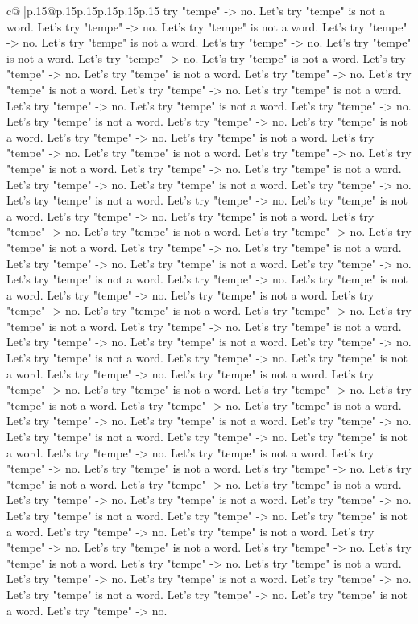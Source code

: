 \documentclass{article}
\begin{document}
{\begin{supertabular}{c@{$\;$}|p{.15\linewidth}@{}p{.15\linewidth}p{.15\linewidth}p{.15\linewidth}p{.15\linewidth}p{.15\linewidth}}
{{{try "tempe" {-}> no. Let's try "tempe" is not a word. Let's try "tempe" {-}> no. Let's try "tempe" is not a word. Let's try "tempe" {-}> no. Let's try "tempe" is not a word. Let's try "tempe" {-}> no. Let's try "tempe" is not a word. Let's try "tempe" {-}> no. Let's try "tempe" is not a word. Let's try "tempe" {-}> no. Let's try "tempe" is not a word. Let's try "tempe" {-}> no. Let's try "tempe" is not a word. Let's try "tempe" {-}> no. Let's try "tempe" is not a word. Let's try "tempe" {-}> no. Let's try "tempe" is not a word. Let's try "tempe" {-}> no. Let's try "tempe" is not a word. Let's try "tempe" {-}> no. Let's try "tempe" is not a word. Let's try "tempe" {-}> no. Let's try "tempe" is not a word. Let's try "tempe" {-}> no. Let's try "tempe" is not a word. Let's try "tempe" {-}> no. Let's try "tempe" is not a word. Let's try "tempe" {-}> no. Let's try "tempe" is not a word. Let's try "tempe" {-}> no. Let's try "tempe" is not a word. Let's try "tempe" {-}> no. Let's try "tempe" is not a word. Let's try "tempe" {-}> no. Let's try "tempe" is not a word. Let's try "tempe" {-}> no. Let's try "tempe" is not a word. Let's try "tempe" {-}> no. Let's try "tempe" is not a word. Let's try "tempe" {-}> no. Let's try "tempe" is not a word. Let's try "tempe" {-}> no. Let's try "tempe" is not a word. Let's try "tempe" {-}> no. Let's try "tempe" is not a word. Let's try "tempe" {-}> no. Let's try "tempe" is not a word. Let's try "tempe" {-}> no. Let's try "tempe" is not a word. Let's try "tempe" {-}> no. Let's try "tempe" is not a word. Let's try "tempe" {-}> no. Let's try "tempe" is not a word. Let's try "tempe" {-}> no. Let's try "tempe" is not a word. Let's try "tempe" {-}> no. Let's try "tempe" is not a word. Let's try "tempe" {-}> no. Let's try "tempe" is not a word. Let's try "tempe" {-}> no. Let's try "tempe" is not a word. Let's try "tempe" {-}> no. Let's try "tempe" is not a word. Let's try "tempe" {-}> no. Let's try "tempe" is not a word. Let's try "tempe" {-}> no. Let's try "tempe" is not a word. Let's try "tempe" {-}> no. Let's try "tempe" is not a word. Let's try "tempe" {-}> no. Let's try "tempe" is not a word. Let's try "tempe" {-}> no. Let's try "tempe" is not a word. Let's try "tempe" {-}> no. Let's try "tempe" is not a word. Let's try "tempe" {-}> no. Let's try "tempe" is not a word. Let's try "tempe" {-}> no. Let's try "tempe" is not a word. Let's try "tempe" {-}> no. Let's try "tempe" is not a word. Let's try "tempe" {-}> no. Let's try "tempe" is not a word. Let's try "tempe" {-}> no. Let's try "tempe" is not a word. Let's try "tempe" {-}> no. Let's try "tempe" is not a word. Let's try "tempe" {-}> no. Let's try "tempe" is not a word. Let's try "tempe" {-}> no. Let's try "tempe" is not a word. Let's try "tempe" {-}> no. Let's try "tempe" is not a word. Let's try "tempe" {-}> no. Let's try "tempe" is not a word. Let's try "tempe" {-}> no. Let's try "tempe" is not a word. Let's try "tempe" {-}> no. Let's try "tempe" is not a word. Let's try "tempe" {-}> no. Let's try "tempe" is not a word. Let's try "tempe" {-}> no. Let's try "tempe" is not a word. Let's try "tempe" {-}> no. Let's try "tempe" is not a word. Let's try "tempe" {-}> no. }}}
\end{supertabular}}
\end{document}
